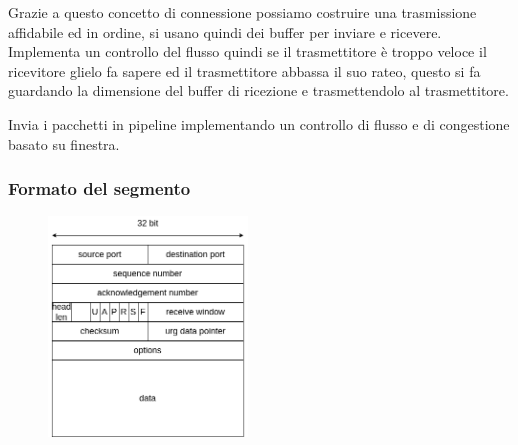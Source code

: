 Grazie a questo concetto di connessione possiamo costruire una trasmissione affidabile ed in ordine, si usano quindi dei buffer per inviare e ricevere.
Implementa un controllo del flusso quindi se il trasmettitore è troppo veloce il ricevitore glielo fa sapere ed il trasmettitore abbassa il suo rateo, questo si fa guardando la dimensione del buffer di ricezione e trasmettendolo al trasmettitore.

Invia i pacchetti in pipeline implementando un controllo di flusso e di congestione basato su finestra.

\subsubsection{Formato del segmento}
\begin{figure}[H]
    \centering
    \includegraphics[width=200px]{images/6_Trasporto/tcp_segment.png}
\end{figure}

